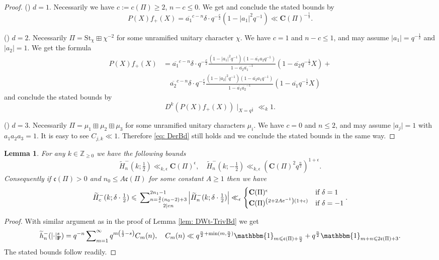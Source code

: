 \documentclass[A4]{amsart}
\def\leq{\leqslant}
\def\geq{\geqslant}
\newtheorem{lemma}      [theorem]{Lemma}
\numberwithin{equation}{section} \everymath{\displaystyle}
\newcommand{\Z}{\mathbb{Z}}
\newcommand{\id}{\mathbbm{1}}
\newcommand{\F}{\mathbf{F}}
\newcommand{\norm}[1][\cdot]{\lvert #1 \rvert}
\newcommand{\extnorm}[1]{\left\lvert #1 \right\rvert}
\newcommand{\Cond}{\mathbf{C}}
\newcommand{\cond}{\mathfrak{c}}
\newcommand{\rmnum}[1]{\romannumeral #1}
\begin{document}
\begin{proof}
\noindent (\rmnum{1}) $d=1$. Necessarily we have $c:=c(\Pi) \geq 2$, $n-c \leq 0$. We get and conclude the stated bounds by
	$$ P(X) f_+(X) = \overline{a_1}^{c-n} \delta \cdot q^{-\frac{c}{2}} (1-\norm[a_1]^2 q^{-1}) \ll \Cond(\Pi)^{-\frac{1}{2}}. $$
	
\noindent (\rmnum{2}) $d=2$. Necessarily $\Pi = \mathrm{St}_{\chi} \boxplus \chi^{-2}$ for some unramified unitary character $\chi$. We have $c = 1$ and $n-c \leq 1$, and may assume $\norm[a_1] = q^{-\frac{1}{2}}$ and $\norm[a_2]=1$. We get the formula
\begin{align*} 
	P(X) f_+(X) &= \overline{a_1}^{c-n} \delta \cdot q^{-\frac{c}{2}} \frac{(1-\norm[a_1]^2q^{-1})(1-\overline{a_1}a_2q^{-1})}{1-\overline{a_2} \overline{a_1}^{-1}} (1-\overline{a_2}q^{-\frac{1}{2}}X) + \\
	&\quad \overline{a_2}^{c-n} \delta \cdot q^{-\frac{c}{2}} \frac{(1-\norm[a_2]^2q^{-1})(1-\overline{a_2}a_1q^{-1})}{1-\overline{a_1} \overline{a_2}^{-1}} (1-\overline{a_1}q^{-\frac{1}{2}}X)
\end{align*}
	and conclude the stated bounds by
\begin{equation} \label{eq: DerBd} 
	D^k \left( P(X) f_+(X) \right) \mid_{X=q^{\frac{1}{2}}} \ll_k 1. 
\end{equation}

\noindent (\rmnum{3}) $d=3$. Necessarily $\Pi = \mu_1 \boxplus \mu_2 \boxplus \mu_3$ for some unramified unitary characters $\mu_i$. We have $c=0$ and $n \leq 2$, and may assume $\norm[a_j]=1$ with $a_1a_2a_3=1$. It is easy to see $C_{j,k} \ll 1$. Therefore \eqref{eq: DerBd} still holds and we conclude the stated bounds in the same way.
\end{proof}

\begin{lemma} \label{lem: DNDWt-TrivBd}
	For any $k \in \Z_{\geq 0}$ we have the following bounds 
	$$ \widetilde{H}_n^{-}(k; \tfrac{1}{2}) \ll_{k,\epsilon} \Cond(\Pi)^{\epsilon} , \quad \widetilde{H}_n^{-}(k; -\tfrac{1}{2}) \ll_{k,\epsilon} \left( \Cond(\Pi)^2 q^{\frac{n}{2}} \right)^{1+\epsilon}. $$
	Consequently if $\cond(\Pi) > 0$ and $n_0 \leq A \cond(\Pi)$ for some constant $A \geq 1$ then we have
	$$ \widetilde{H}_c^-(k; \delta \cdot \tfrac{1}{2}) \leq \sideset{}{_{\substack{n=\frac{2}{e}(n_0-2)+3 \\ 2 \mid en}}^{2n_1-1}} \sum \extnorm{\widetilde{H}_n^{-}(k; \delta \cdot \tfrac{1}{2})} \ll_{\epsilon}
	\begin{cases} 
		\Cond(\Pi)^{\epsilon} & \text{if } \delta = 1 \\
		\Cond(\Pi)^{\left( 2+2Ae^{-1} \right)(1+\epsilon)} & \text{if } \delta = -1
	\end{cases}. $$
\end{lemma}
\begin{proof}
	With similar argument as in the proof of Lemma \ref{lem: DWt-TrivBd} we get
	$$ \widetilde{h}_n^-(\norm_{\F}^s) = q^{-n} \sideset{}{_{m=1}^{\infty}} \sum q^{m \left( \frac{1}{2}-s \right)} C_m(n), \quad C_m(n) \ll q^{\frac{n}{2}+\min(m,\frac{n}{2})} \id_{m \leq \cond(\Pi)+\frac{n}{2}} + q^{\frac{n}{2}} \id_{m+n \leq 2\cond(\Pi)+3}. $$
	The stated bounds follow readily.
\end{proof}
\end{document}
